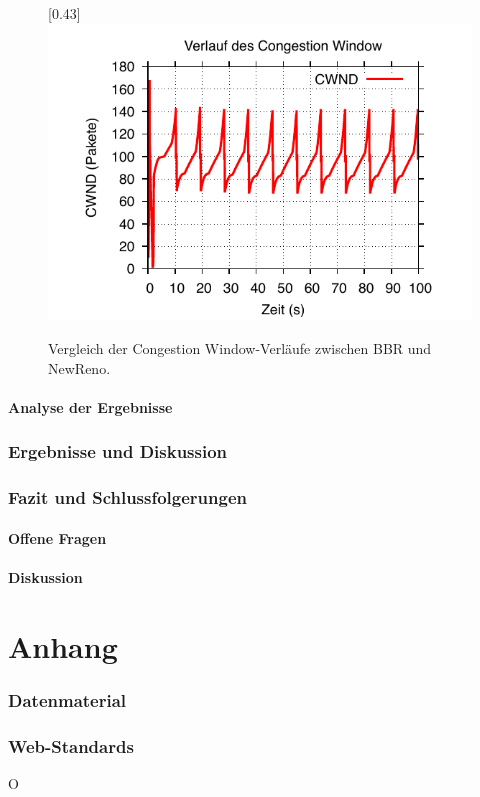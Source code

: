 \documentclass[paper=a4,fontsize=12pt,ngerman]{scrartcl}
\begin{document}
\begin{figure}[htp]
        [0.43\textwidth]{
        \includegraphics[width=\linewidth]{graphics/cubicCW.pdf}
    }

    \caption{Vergleich der Congestion Window-Verläufe zwischen BBR und NewReno.}
    \label{fig:cwnd-comparison}
\end{figure}

\subsection{Analyse der Ergebnisse}


\section{Ergebnisse und Diskussion}


\section{Fazit und Schlussfolgerungen}


\subsection{Offene Fragen}


\subsection{Diskussion}


\clearpage
\renewcommand\refname{Literaturverzeichnis}




\clearpage
\appendix
\part*{Anhang}

\section{Datenmaterial}


\section{Web-Standards}
O
\end{document}
